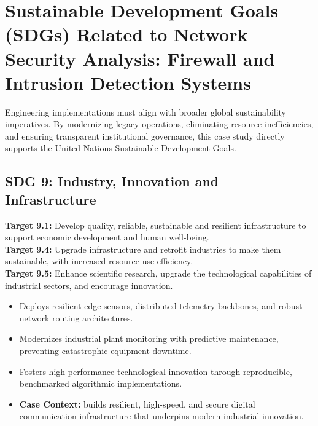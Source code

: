 \section{Sustainable Development Goals (SDGs) Related to Network Security Analysis: Firewall and Intrusion Detection Systems}
Engineering implementations must align with broader global sustainability imperatives. By modernizing legacy operations, eliminating resource inefficiencies, and ensuring transparent institutional governance, this case study directly supports the United Nations Sustainable Development Goals.

\subsection{SDG 9: Industry, Innovation and Infrastructure}
\noindent\textbf{Target 9.1:} Develop quality, reliable, sustainable and resilient infrastructure to support economic development and human well-being. \\
\noindent\textbf{Target 9.4:} Upgrade infrastructure and retrofit industries to make them sustainable, with increased resource-use efficiency. \\
\noindent\textbf{Target 9.5:} Enhance scientific research, upgrade the technological capabilities of industrial sectors, and encourage innovation.
\begin{itemize}
  \item Deploys resilient edge sensors, distributed telemetry backbones, and robust network routing architectures.
  \item Modernizes industrial plant monitoring with predictive maintenance, preventing catastrophic equipment downtime.
  \item Fosters high-performance technological innovation through reproducible, benchmarked algorithmic implementations.
  \item \textbf{Case Context:} builds resilient, high-speed, and secure digital communication infrastructure that underpins modern industrial innovation.
\end{itemize}

